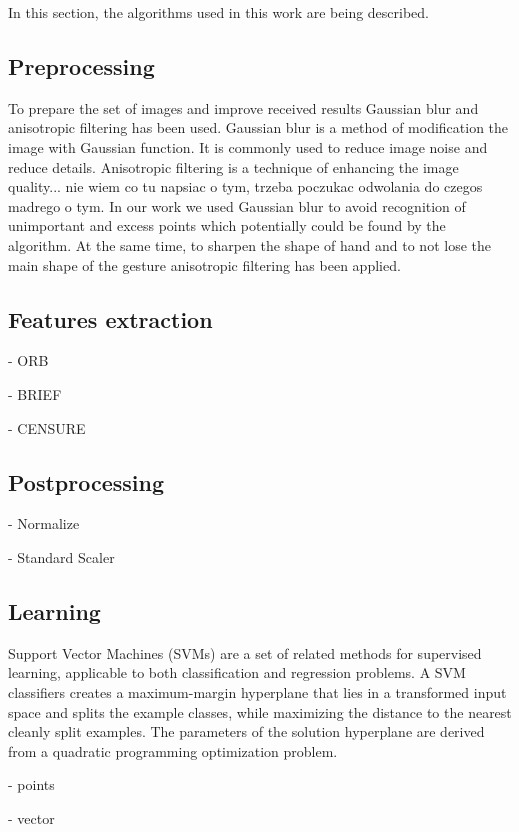 \documentclass[11pt,a4paper]{article}
\begin{document}
	In this section, the algorithms used in this work are being described.

\subsection{Preprocessing}
	
	To prepare the set of images and improve received results Gaussian blur and anisotropic filtering has been used. Gaussian blur is a method of modification the image with Gaussian function. It is commonly used to reduce image noise and reduce details. Anisotropic filtering is a technique of enhancing the image quality... nie wiem co tu napsiac o tym, trzeba poczukac odwolania do czegos madrego o tym. In our work we used Gaussian blur to avoid recognition of unimportant and excess points which potentially could be found by the algorithm. At the same time, to sharpen the shape of hand and to not lose the main shape of the gesture anisotropic filtering has been applied.

\subsection{Features extraction}

- ORB

- BRIEF

- CENSURE 

\subsection{Postprocessing}

- Normalize

- Standard Scaler 

\subsection{Learning}

Support Vector Machines (SVMs) are a set of related methods for supervised learning, applicable to both classification and regression problems. A SVM classifiers creates a maximum-margin hyperplane that lies in a transformed input space and splits the example classes, while maximizing the distance to the nearest cleanly split examples. The parameters of the solution hyperplane are derived from a quadratic programming optimization problem\cite{SVM1}.

- points

- vector
\end{document}

